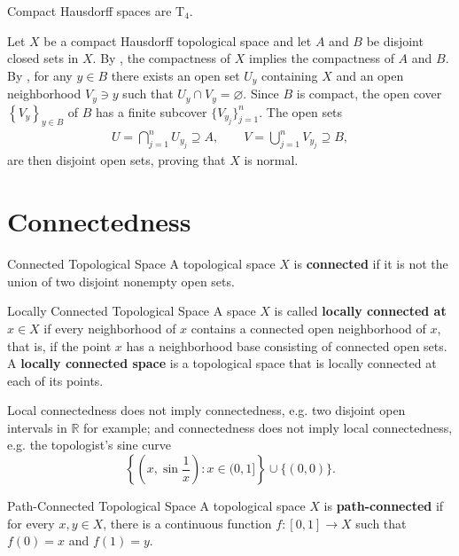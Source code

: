 \documentclass{report}
\begin{document}
\begin{proposition}{}{}
	Compact Hausdorff spaces are $\mathrm{T}_4$.
\end{proposition}
\begin{prf}
	Let $X$ be a compact Hausdorff topological space and let $A$ and $B$ be disjoint closed sets in $X$. By , the compactness of $X$ implies the compactness of $A$ and $B$. By , for any $y\in B$ there exists an open set $U_y$ containing $X$ and an open neighborhood $V_y\ni y$ such that $U_y\cap V_y =\varnothing$. Since $B$ is compact, the open cover $\left\lbrace V_y\right\rbrace _{y\in B}$ of $B$ has a finite subcover $\{V_{y_j}\}_{j=1}^n$. The open sets 
\begin{align*}
U=\bigcap_{j=1}^n U_{y_j} \supseteq A,  \qquad V=\bigcup_{j=1}^n V_{y_j} \supseteq B,
\end{align*}
are then disjoint open sets, proving that $X$ is normal.
\end{prf}



\section{Connectedness}
\begin{definition}{Connected Topological Space}{}
	A topological space $X$ is \textbf{connected} if it is not the union of two disjoint nonempty open sets.
\end{definition}

\begin{definition}{Locally Connected Topological Space}{}
	A space $X$ is called \textbf{locally connected at $x\in X$} if every neighborhood of $x$ contains a connected open neighborhood of $x$, that is, if the point $x$ has a neighborhood base consisting of connected open sets. A \textbf{locally connected space} is a topological space that is locally connected at each of its points.
\end{definition}

Local connectedness does not imply connectedness, e.g. two disjoint open intervals in $\mathbb {R}$ for example; and connectedness does not imply local connectedness, e.g. the topologist's sine curve $$\left\{\left(x, \sin \frac{1}{x}\right): x \in(0,1]\right\} \cup\{(0,0)\}.$$
\begin{definition}{Path-Connected Topological Space}{}
	A topological space $X$ is \textbf{path-connected} if for every $x,y\in X$, there is a continuous function $f:[0,1]\to X$ such that $f(0)=x$ and $f(1)=y$.
\end{definition}
\end{document}
